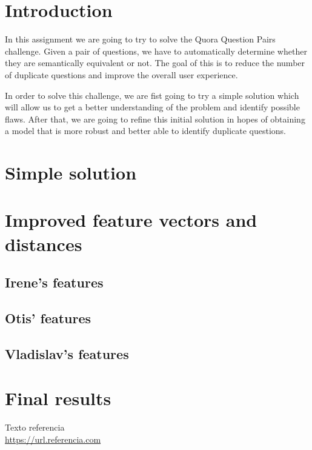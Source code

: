 \documentclass[11pt,a4paper]{article}
\begin{document}
\tableofcontents
\thispagestyle{empty}				%

\newpage

\section{Introduction}

In this assignment we are going to try to solve the Quora Question Pairs challenge. Given a pair
of questions, we have to automatically determine whether they are semantically equivalent or not.
The goal of this is to reduce the number of duplicate questions and improve the overall user experience.

In order to solve this challenge, we are fist going to try a simple solution which will allow us
to get a better understanding of the problem and identify possible flaws. After that, we are
going to refine this initial solution in hopes of obtaining a model that is more robust and better
able to identify duplicate questions.

\section{Simple solution}

\section{Improved feature vectors and distances}

\subsection{Irene's features}

\subsection{Otis' features}

\subsection{Vladislav's features}

\section{Final results}

\newpage

\begin{thebibliography}{5}

Texto referencia
\\\url{https://url.referencia.com}

\end{thebibliography}
\end{document}
